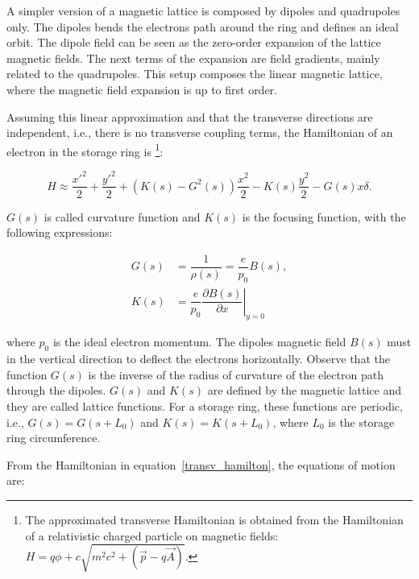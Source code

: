 A simpler version of a magnetic lattice is composed by dipoles and quadrupoles only. The dipoles bends the electrons path around the ring and defines an ideal orbit. The dipole field can be seen as the zero-order expansion of the lattice magnetic fields. The next terms of the expansion are field gradients, mainly related to the quadrupoles. This setup composes the linear magnetic lattice, where the magnetic field expansion is up to first order.

Assuming this linear approximation and that the transverse directions are independent, i.e., there is no transverse coupling terms, the Hamiltonian of an electron in the storage ring is \footnote{The approximated transverse Hamiltonian is obtained from the Hamiltonian of a relativistic charged particle on magnetic fields: $H = q\phi + c\sqrt{m^2c^2 + \left(\vec{p} - q\vec{A}\right) }$.}:

\begin{equation}
    H \approx \dfrac{{x'}^2}{2} + \dfrac{{y'}^2}{2} + \left(K(s)- G^{2}(s)\right)\dfrac{{x}^2}{2} - K(s) \frac{y^2}{2} - G(s) x \delta.
    \label{transv_hamilton}
\end{equation}

$G(s)$ is called curvature function and $K(s)$ is the focusing function, with the following expressions:

\begin{align}
    G(s) &= \dfrac{1}{\rho(s)} = \dfrac{e}{p_0}B(s), \\
    K(s) &= \dfrac{e}{p_0}\left.\dfrac{\partial B(s)}{\partial x}\right|_{y=0}
\end{align}

where $p_0$ is the ideal electron momentum. The dipoles magnetic field $B(s)$ must in the vertical direction to deflect the electrons horizontally. Observe that the function $G(s)$ is the inverse of the radius of curvature of the electron path through the dipoles. $G(s)$ and $K(s)$ are defined by the magnetic lattice and they are called lattice functions. For a storage ring, these functions are periodic, i.e., $G(s) = G(s+L_0)$ and $K(s) = K(s+L_0)$, where $L_0$ is the storage ring circumference.


From the Hamiltonian in equation~\eqref{transv_hamilton}, the equations of motion are:

